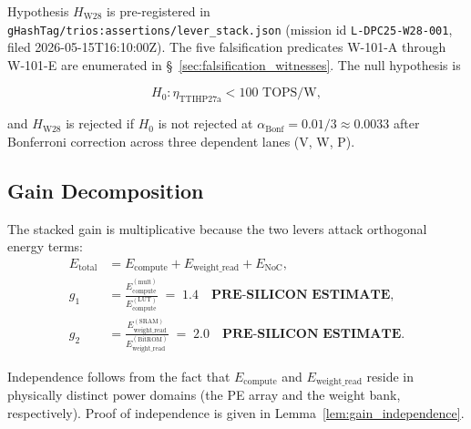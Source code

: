 Hypothesis \(H_{\mathrm{W28}}\) is pre-registered in
\texttt{gHashTag/trios:assertions/lever\_stack.json}
(mission id \texttt{L-DPC25-W28-001}, filed 2026-05-15T16:10:00Z).
The five falsification predicates W-101-A through W-101-E are enumerated
in §~\ref{sec:falsification_witnesses}.  The null hypothesis is

\[
  H_{0}: \eta_{\mathrm{TTIHP27a}} < 100\text{ TOPS/W},
\]

and \(H_{\mathrm{W28}}\) is rejected if \(H_{0}\) is not rejected at
\(\alpha_{\mathrm{Bonf}} = 0.01/3 \approx 0.0033\) after Bonferroni correction
across three dependent lanes (V, W, P).

\subsection{Gain Decomposition}

The stacked gain is multiplicative because the two levers attack orthogonal
energy terms:
\begin{align}
  E_{\mathrm{total}} &= E_{\mathrm{compute}} + E_{\mathrm{weight\_read}} + E_{\mathrm{NoC}}, \label{eq:energy_decomp}\\
  g_{1} &= \frac{E_{\mathrm{compute}}^{(\mathrm{mult})}}{E_{\mathrm{compute}}^{(\mathrm{LUT})}}
         \;=\; 1.4 \quad \textbf{PRE-SILICON ESTIMATE}, \label{eq:g1}\\
  g_{2} &= \frac{E_{\mathrm{weight\_read}}^{(\mathrm{SRAM})}}{E_{\mathrm{weight\_read}}^{(\mathrm{BitROM})}}
         \;=\; 2.0 \quad \textbf{PRE-SILICON ESTIMATE}. \label{eq:g2}
\end{align}

Independence follows from the fact that \(E_{\mathrm{compute}}\) and
\(E_{\mathrm{weight\_read}}\) reside in physically distinct power domains
(the PE array and the weight bank, respectively).  Proof of independence
is given in Lemma~\ref{lem:gain_independence}.

